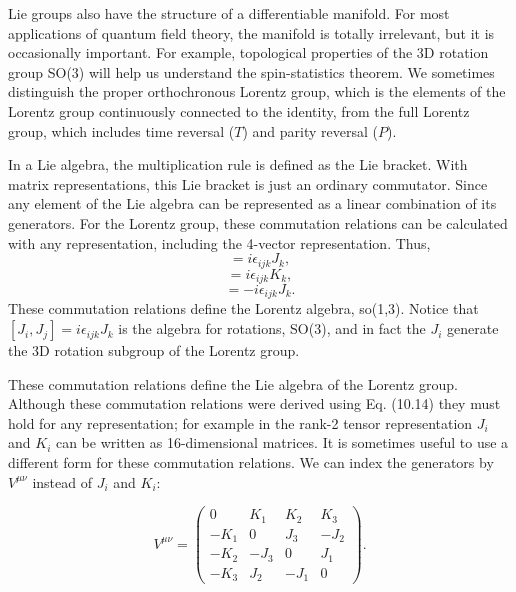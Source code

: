 \documentclass[11pt]{article}
\theoremstyle{definition}
\begin{document}
Lie groups also have the structure of a differentiable manifold. For most applications of quantum field theory, the manifold is totally irrelevant, but it is occasionally important. For example, topological properties of the 3D rotation group SO(3) will help us understand the spin-statistics theorem. We sometimes distinguish the proper orthochronous Lorentz group, which is the elements of the Lorentz group continuously connected to the identity, from the full Lorentz group, which includes time reversal (\( T \)) and parity reversal (\( P \)).

In a Lie algebra, the multiplication rule is defined as the Lie bracket. With matrix representations, this Lie bracket is just an ordinary commutator. Since any element of the Lie algebra can be represented as a linear combination of its generators. For the Lorentz group, these commutation relations can be calculated with any representation, including the 4-vector representation. Thus,
\begin{equation}
    [J_i, J_j] = i \epsilon_{ijk}J_k,
\end{equation}
\begin{equation}
    [J_i, K_j] = i \epsilon_{ijk}K_k,
\end{equation}
\begin{equation}
    [K_i, K_j] = -i \epsilon_{ijk}J_k.
\end{equation}
These commutation relations define the Lorentz algebra, so(1,3). Notice that $[J_i, J_j] = i\epsilon_{ijk}J_k$ is the algebra for rotations, SO(3), and in fact the $J_i$ generate the 3D rotation subgroup of the Lorentz group. 

These commutation relations define the Lie algebra of the Lorentz group. Although these commutation relations were derived using Eq. (10.14) they must hold for any representation; for example in the rank-2 tensor representation \( J_i \) and \( K_i \) can be written as 16-dimensional matrices. It is sometimes useful to use a different form for these commutation relations. We can index the generators by \( V^{\mu \nu} \) instead of \( J_i \) and \( K_i \):

\begin{equation}
V^{\mu \nu} = 
\begin{pmatrix}
0 & K_1 & K_2 & K_3 \\
-K_1 & 0 & J_3 & -J_2 \\
-K_2 & -J_3 & 0 & J_1 \\
-K_3 & J_2 & -J_1 & 0
\end{pmatrix}.
\end{equation}
\end{document}
